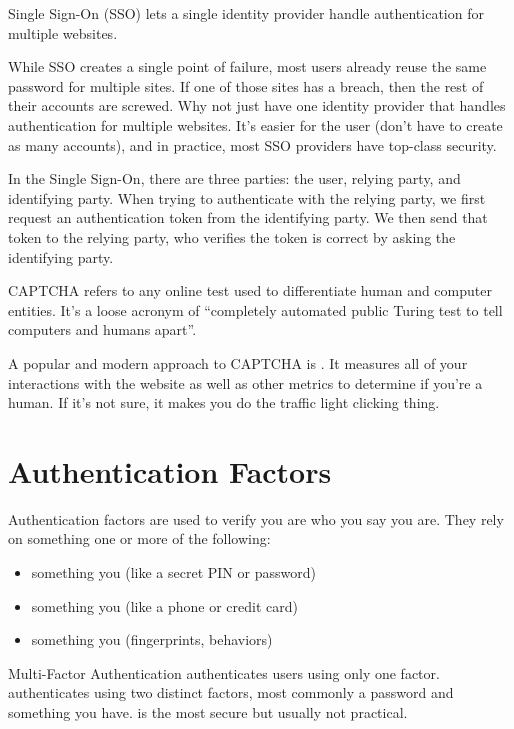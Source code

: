 \documentclass[code]{amznotes}
\begin{document}
\begin{dfnbox}{Single Sign-On (SSO)}{}
     lets a single identity provider handle authentication for multiple websites.
\end{dfnbox}

While SSO creates a single point of failure, most users already reuse the same password for multiple sites. If one of those sites has a breach, then the rest of their accounts are screwed. Why not just have one identity provider that handles authentication for multiple websites. It's easier for the user (don't have to create as many accounts), and in practice, most SSO providers have top-class security.

In the Single Sign-On, there are three parties: the user, relying party, and identifying party. When trying to authenticate with the relying party, we first request an authentication token from the identifying party. We then send that token to the relying party, who verifies the token is correct by asking the identifying party.


\begin{dfnbox}{CAPTCHA}{}
     refers to any online test used to differentiate human and computer entities. It's a loose acronym of ``completely automated public Turing test to tell computers and humans apart''.
\end{dfnbox}

A popular and modern approach to CAPTCHA is . It measures all of your interactions with the website as well as other metrics to determine if you're a human. If it's not sure, it makes you do the traffic light clicking thing.


\section{Authentication Factors}
Authentication factors are used to verify you are who you say you are. They rely on something one or more of the following:
\begin{itemize}[noitemsep]
    \item something you  (like a secret PIN or password)
    \item something you  (like a phone or credit card)
    \item something you  (fingerprints, behaviors)
\end{itemize}

\begin{dfnbox}{Multi-Factor Authentication}{}
     authenticates users using only one factor.  authenticates using two distinct factors, most commonly a password and something you have.  is the most secure but usually not practical.
\end{dfnbox}
\end{document}
